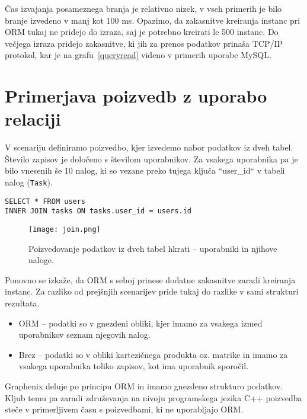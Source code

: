 \documentclass[a4paper,12pt,openright]{book}
\begin{document}
    \noindent
    Čas izvajanja posameznega branja je relativno nizek, v vseh primerih je bilo branje izvedeno v manj kot 100 ms. Opazimo, da zakasnitve kreiranja instanc pri ORM tukaj ne pridejo do izraza, saj je potrebno kreirati le 500 instanc. Do večjega izraza pridejo zakasnitve, ki jih za prenos podatkov prinaša TCP/IP protokol, kar je na grafu~\ref{queryread} videno v primerih uporabe MySQL.

    \section{Primerjava poizvedb z uporabo relaciji}
    \label{join_lbl}

    V scenariju definiramo poizvedbo, kjer izvedemo nabor podatkov iz dveh tabel. Število zapisov je določeno s številom uporabnikov. Za vsakega uporabnika pa je bilo vnesenih še 10 nalog, ki so vezane preko tujega ključa ``user\_id`` v tabeli nalog ({\tt Task}).
    
\begin{verbatim}
SELECT * FROM users 
INNER JOIN tasks ON tasks.user_id = users.id
\end{verbatim}

    \begin{figure}[H]
        \centerline{\texttt{[image: join.png]}}
        \caption{Poizvedovanje podatkov iz dveh tabel hkrati – uporabniki in njihove naloge.}
        \label{join}
    \end{figure}

    \noindent
    Ponovno se izkaže, da ORM s seboj prinese dodatne zakasnitve zaradi kreiranja instanc. Za razliko od prejšnjih scenarijev pride tukaj do razlike v sami strukturi rezultata.
    
    \begin{itemize}
        \item ORM – podatki so v gnezdeni obliki, kjer imamo za vsakega izmed uporabnikov seznam njegovih nalog.
        \item Brez – podatki so v obliki kartezičnega produkta oz. matrike in imamo za vsakega uporabnika toliko zapisov, kot ima uporabnik sporočil.
    \end{itemize}

    \noindent
    Graphenix deluje po principu ORM in imamo gnezdeno strukturo podatkov. Kljub temu pa zaradi združevanja na nivoju programskega jezika C++ poizvedba steče v primerljivem času s poizvedbami, ki ne uporabljajo ORM.
    
\end{document}
